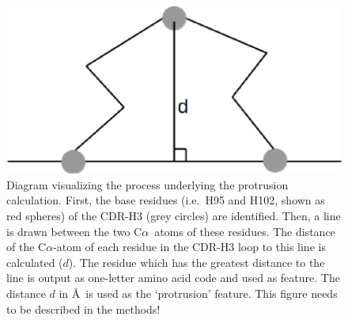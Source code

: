 \documentclass[12pt]{article}
\newcommand{\ca}{\mbox{C$\alpha$}}
\newcommand{\lilian}[1]{ {\color{red}{\bfseries Lilian:} #1}}
\begin{document}
\begin{figure}
  \centering
  \includegraphics[scale=0.5]{protrusion.eps}
  \caption {Diagram
    visualizing the process underlying the protrusion
    calculation. First, the base residues (i.e.\ H95 and H102, shown as
    red spheres) of the CDR-H3 (grey circles) are identified. Then, a
    line is drawn between the two \ca\ atoms of these residues.
    The distance of the \ca-atom of each residue in the
    CDR-H3 loop to this line is calculated ($d$). The residue which has the
    greatest distance to the line is output
    as one-letter amino acid code and used as feature. The distance $d$ in
    \AA\ is used as the `protrusion'
    feature. \lilian{This figure needs to be described in the methods!}}
  \label{fig:loopdist}
\end{figure}
\end{document}
